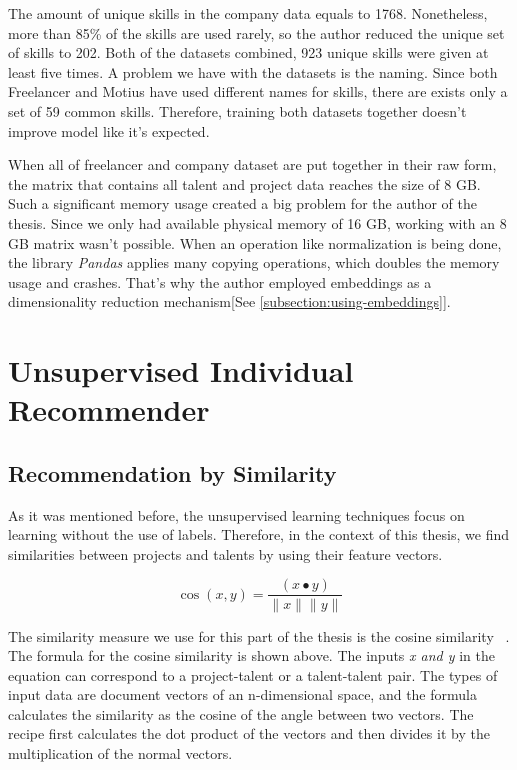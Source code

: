 The amount of unique skills in the company data equals to 1768. Nonetheless, more than 85\% of the skills are used rarely, so the author reduced the unique set of skills to  202. Both of the datasets combined, 923 unique skills were given at least five times. A problem we have with the datasets is the naming. Since both Freelancer and Motius have used different names for skills, there are exists only a set of 59 common skills. Therefore, training both datasets together doesn't improve model like it's expected.



When all of freelancer and company dataset are put together in their raw form, the matrix that contains all talent and project data reaches the size of 8 GB. Such a significant memory usage created a big problem for the author of the thesis. Since we only had available physical memory of 16 GB, working with an 8 GB matrix wasn't possible. When an operation like normalization is being done, the library \textit{Pandas} applies many copying operations, which doubles the memory usage and crashes. That's why the author employed embeddings as a dimensionality reduction mechanism[See \ref{subsection:using-embeddings}].




\section{Unsupervised Individual Recommender}\label{implementation-unsupervised-individual}

\subsection{Recommendation by Similarity}\label{implementation-unsupervised-similarity}

As it was mentioned before, the unsupervised learning techniques focus on learning without the use of labels. Therefore, in the context of this thesis, we find similarities between projects and talents by using their feature vectors. 



\begin{equation}
\cos (x, y)=\frac{(x \bullet y)}{\|x\|\|y\|}
\end{equation}


The similarity measure we use for this part of the thesis is the cosine similarity ~\parencite{amatriain2011data}. The formula for the cosine similarity is shown above. The inputs  \textit{x and y} in the equation can correspond to a project-talent or a talent-talent pair. The types of input data are document vectors of an n-dimensional space, and the formula calculates the similarity as the cosine of the angle between two vectors. The recipe first calculates the dot product of the vectors and then divides it by the multiplication of the normal vectors.


